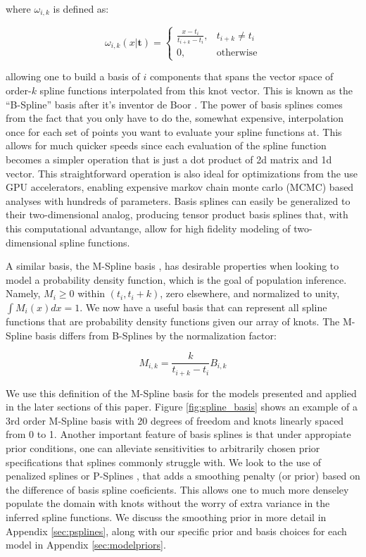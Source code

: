 \noindent where $\omega_{i,k}$ is defined as:

\begin{equation}
\omega_{i,k}(x | \mathbf{t}) =
\begin{cases}
    \frac{x-t_i}{t_{i+k}-t_i}, & t_{i+k} \neq t_i \\
    0, & \text{otherwise}
\end{cases}
\end{equation}

\noindent allowing one to build a basis of $i$ components that spans the vector space of order-$k$ spline functions interpolated 
from this knot vector. This is known as the ``B-Spline'' basis after it's inventor de Boor \cite{deBoor78}. The power of basis splines
comes from the fact that you only have to do the, somewhat expensive, interpolation once for each set of points you want to evaluate your
spline functions at. This allows for much quicker speeds since each evaluation of the spline function becomes a simpler operation that is just
a dot product of 2d matrix and 1d vector. This straightforward operation is also ideal for optimizations from the use GPU accelerators, 
enabling expensive markov chain monte carlo (MCMC) based analyses with hundreds of parameters. Basis splines can easily be generalized to 
their two-dimensional analog, producing tensor product basis splines that, with this computational advantange, allow for high fidelity
modeling of two-dimensional spline functions.

A similar basis, the M-Spline basis \citep{monotone_regression_splines}, has desirable properties when looking to model a probability density function, 
which is the goal of population inference. Namely, $M_i \geq 0$ within $(t_i, t_i+k)$, zero elsewhere, and normalized to unity, $\int M_i(x)dx = 1$. We now have
a useful basis that can represent all spline functions that are probability density functions given our array of knots. The M-Spline basis differs 
from B-Splines by the normalization factor:

\begin{equation}\label{eq:MB_SplineRelation}
M_{i,k} = \frac{k}{t_{i+k} - t_i} B_{i,k}
\end{equation}

\noindent We use this definition of the M-Spline basis for the models presented and applied in the later sections of this paper. 
Figure \ref{fig:spline_basis} shows an example of a 3rd order M-Spline basis with 20 degrees of freedom and knots linearly spaced from 0 to 1.
Another important feature of basis splines is that under appropiate prior conditions, one can alleviate sensitivities to arbitrarily 
chosen prior specifications that splines commonly struggle with. We look to the use of penalized splines or P-Splines \cite{eilers2021practical,BayesianPSplines,Jullion2007RobustSO}, 
that adds a smoothing penalty (or prior) based on the difference of basis spline coeficients. This allows one to much more denseley populate
the domain with knots without the worry of extra variance in the inferred spline functions. We discuss the smoothing prior in more detail 
in Appendix \ref{sec:psplines}, along with our specific prior and basis choices for each model in Appendix \ref{sec:modelpriors}.